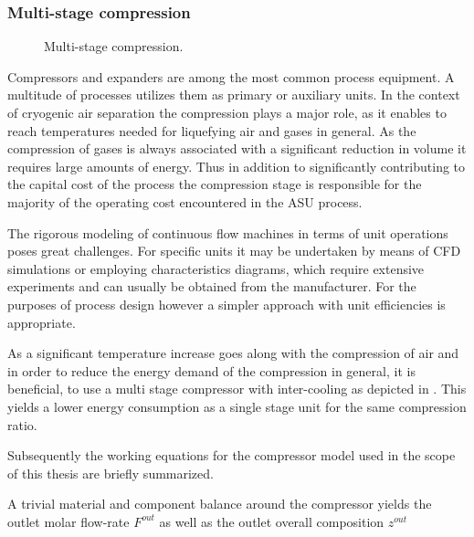     \subsubsection{Multi-stage compression}
        \begin{figure}
            \center
            
            \caption{Multi-stage compression.}
            \label{fig:multi_stage_compression}
        \end{figure}

        Compressors and expanders are among the most common process equipment. A multitude of processes
        utilizes them as primary or auxiliary units. In the context of cryogenic air separation the 
        compression plays a major role, as it enables to reach temperatures needed for liquefying 
        air and gases in general. As the compression of gases is always associated with a significant 
        reduction in volume it requires large amounts of energy. Thus in addition to significantly 
        contributing to the capital cost of the process the compression stage is responsible for 
        the majority of the operating cost encountered in the ASU process. 

        The rigorous modeling of continuous flow machines in terms of unit operations poses great challenges.
        For specific units it may be undertaken by means of CFD simulations or employing characteristics diagrams,
        which require extensive experiments and can usually be obtained from the manufacturer.
        For the purposes of process design however a simpler approach with unit efficiencies is appropriate.

        As a significant temperature increase goes along with the compression of air and in order to reduce
        the energy demand of the compression in general, it is beneficial, to use a multi stage compressor with
        inter-cooling as depicted in . This yields a lower energy consumption
        as a single stage unit for the same compression ratio.

        Subsequently the working equations for the compressor model used in the scope of this thesis are 
        briefly summarized. 

        A trivial material and component balance around the compressor yields the outlet molar flow-rate $F^{out}$
        as well as the outlet overall composition $z^{out}$

